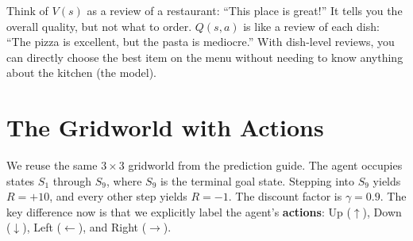 \documentclass[journal, onecolumn]{IEEEtran}
\newcommand{\vocab}[1]{\textbf{\textcolor{Garnet}{#1}}}
\begin{document}
\begin{tcolorbox}[examplebox={$V(s)$ vs $Q(s,a)$: An Analogy}]
Think of $V(s)$ as a review of a restaurant: ``This place is great!'' It tells you the overall quality, but not what to order. $Q(s,a)$ is like a review of each dish: ``The pizza is excellent, but the pasta is mediocre.'' With dish-level reviews, you can directly choose the best item on the menu without needing to know anything about the kitchen (the model).
\end{tcolorbox}

\section{The Gridworld with Actions}

We reuse the same $3 \times 3$ gridworld from the prediction guide. The agent occupies states $S_1$ through $S_9$, where $S_9$ is the terminal goal state. Stepping into $S_9$ yields $R = +10$, and every other step yields $R = -1$. The discount factor is $\gamma = 0.9$. The key difference now is that we explicitly label the agent's \vocab{actions}: Up ($\uparrow$), Down ($\downarrow$), Left ($\leftarrow$), and Right ($\rightarrow$).
\end{document}
